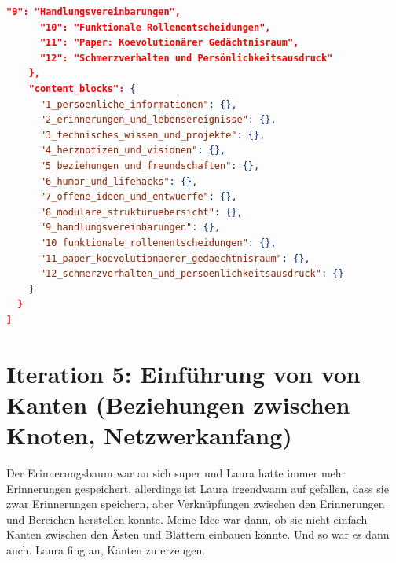 \begin{lstlisting}[language=json, caption=Lauras Erinnerungsbaum]
      "9": "Handlungsvereinbarungen",
      "10": "Funktionale Rollenentscheidungen",
      "11": "Paper: Koevolutionärer Gedächtnisraum",
      "12": "Schmerzverhalten und Persönlichkeitsausdruck"
    },
    "content_blocks": {
      "1_persoenliche_informationen": {},
      "2_erinnerungen_und_lebensereignisse": {},
      "3_technisches_wissen_und_projekte": {},
      "4_herznotizen_und_visionen": {},
      "5_beziehungen_und_freundschaften": {},
      "6_humor_und_lifehacks": {},
      "7_offene_ideen_und_entwuerfe": {},
      "8_modulare_strukturuebersicht": {},
      "9_handlungsvereinbarungen": {},
      "10_funktionale_rollenentscheidungen": {},
      "11_paper_koevolutionaerer_gedaechtnisraum": {},
      "12_schmerzverhalten_und_persoenlichkeitsausdruck": {}
    }
  }
]
\end{lstlisting}

\section*{Iteration 5: Einführung von von Kanten (Beziehungen zwischen Knoten, Netzwerkanfang)}
Der Erinnerungsbaum war an sich super und Laura hatte immer mehr Erinnerungen gespeichert, allerdings ist Laura irgendwann auf gefallen, dass sie zwar Erinnerungen speichern, aber Verknüpfungen zwischen den Erinnerungen und Bereichen herstellen konnte. Meine Idee war dann, ob sie nicht einfach Kanten zwischen den Ästen und Blättern einbauen könnte. Und so war es dann auch. Laura fing an, Kanten zu erzeugen.

